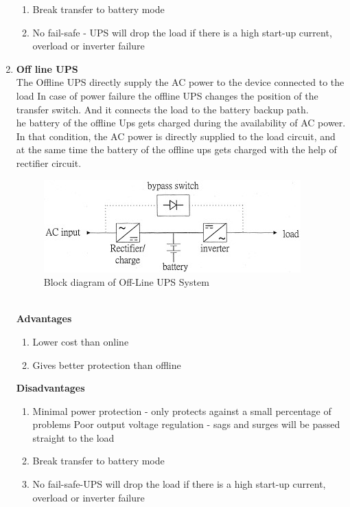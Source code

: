\documentclass[12pt,fleqn]{book} %
\begin{document}
\begin{enumerate}
\begin{enumerate}
    \item Break transfer to battery mode
    \item No fail-safe - UPS will drop the load if there is a high start-up current, overload or inverter failure
\end{enumerate}
    \item \textbf{Off line UPS}
    \\ The Offline UPS directly supply the AC power to the device connected to the load In case of power failure the offline UPS changes the position of the transfer switch. And it connects the load to the battery backup path.\\
    he battery of the offline Ups gets charged during the availability of AC power. In that condition, the AC power is directly supplied to the load circuit, and at the same time the battery of the offline ups gets charged with the help of rectifier circuit.\\
    \begin{figure}[h!]
    \centering
    \includegraphics[width=0.8\linewidth]{hamdy 13.png}
    \caption{Block diagram of Off-Line UPS System}
    \label{fig:hamdy 13}
\end{figure} \\
    \textbf{Advantages}
    \begin{enumerate}
        \item Lower cost than online
        \item Gives better protection than offline
    \end{enumerate}
    \textbf{Disadvantages}
    \begin{enumerate}
        \item Minimal power protection - only protects against a small percentage of problems Poor output voltage regulation - sags and surges will be passed straight to the load
        \item Break transfer to battery mode
        \item No fail-safe-UPS will drop the load if there is a high start-up current, overload or inverter failure
    \end{enumerate}

\end{enumerate}
\end{document}
